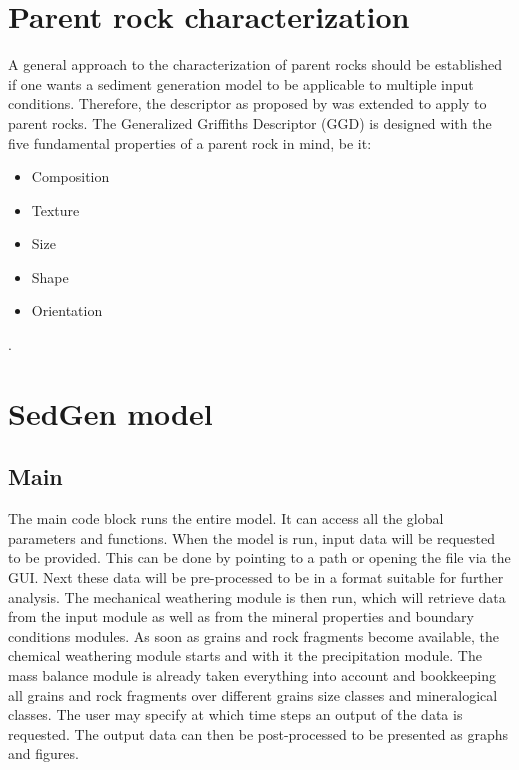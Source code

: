 \section{Parent rock characterization} %
    A general approach to the characterization of parent rocks should be established if one wants a sediment generation model to be applicable to multiple input conditions. %
    Therefore, the descriptor as proposed by \cite{Griffiths_1952,Griffiths_1961} was extended to apply to parent rocks. %
    The Generalized Griffiths Descriptor (\gls{GGD}) is designed with the five fundamental properties of a parent rock in mind, be it:
    \begin{itemize}
        \item Composition
        \item Texture
        \item Size
        \item Shape
        \item Orientation
    \end{itemize}. %


\section{SedGen model}
    \subsection{Main}
    The main code block runs the entire model. %
    It can access all the global parameters and functions. %
    When the model is run, input data will be requested to be provided. %
    This can be done by pointing to a path or opening the file via the GUI. %
    Next these data will be pre-processed to be in a format suitable for further analysis. %
    The mechanical weathering module is then run, which will retrieve data from the input module as well {}as from the mineral properties and boundary conditions modules. %
    As soon as grains and rock fragments become available, the chemical weathering module starts and with it the precipitation module. %
    The mass balance module is already taken everything into account and bookkeeping all grains and rock fragments over different grains size classes and mineralogical classes. %
    The user may specify at which time steps an output of the data is requested. %
    The output data can then be post-processed to be presented as graphs and figures. %

